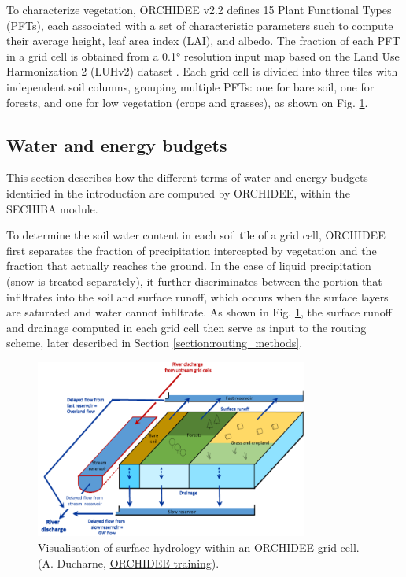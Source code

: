 To characterize vegetation, ORCHIDEE v2.2 defines 15 Plant Functional Types (PFTs), each associated with a set of characteristic parameters such to compute their average height, leaf area index (LAI), and albedo. The fraction of each PFT in a grid cell is obtained from a 0.1° resolution input map based on the Land Use Harmonization 2 (LUHv2) dataset \citep{hurtt_harmonization_2020, lurton_implementation_2020}. 
Each grid cell is divided into three tiles with independent soil columns, grouping multiple PFTs: one for bare soil, one for forests, and one for low vegetation (crops and grasses), as shown on Fig. \ref{fig:water_balance_AD}. 

\subsection{Water and energy budgets}

This section describes how the different terms of water and energy budgets identified in the introduction are computed by ORCHIDEE, within the SECHIBA module. 

To determine the soil water content in each soil tile of a grid cell, ORCHIDEE first separates the fraction of precipitation intercepted by vegetation and the fraction that actually reaches the ground. In the case of liquid precipitation (snow is treated separately), it further discriminates between the portion that infiltrates into the soil and surface runoff, which occurs when the surface layers are saturated and water cannot infiltrate. As shown in Fig. \ref{fig:water_balance_AD}, the surface runoff and drainage computed in each grid cell then serve as input to the routing scheme, later described in Section \ref{section:routing_methods}.

\begin{figure}[hbtp]
    \centering
    \includegraphics[width=0.8\textwidth]{images/methods/water_balance_AD.png}
    \caption{Visualisation of surface hydrology within an ORCHIDEE grid cell. (A. Ducharne, \href{https://forge.ipsl.fr/orchidee/attachment/wiki/GroupActivities/Training/cours_orchidee_feb2024_ducharne.pdf}{ORCHIDEE training}).}
    \label{fig:water_balance_AD}
\end{figure}

